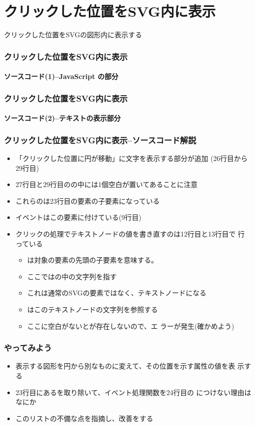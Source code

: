 \section{クリックした位置をSVG内に表示}
\begin{frame}[containsverbatim]
クリックした位置をSVGの図形内に表示する
\end{frame}
\begin{frame}[containsverbatim]
 \frametitle{クリックした位置をSVG内に表示}
 \framesubtitle{ソースコード(1)--JavaScript の部分}
\end{frame}
\begin{frame}[containsverbatim]
 \frametitle{クリックした位置をSVG内に表示}
 \framesubtitle{ソースコード(2)--テキストの表示部分}
\end{frame}
\begin{frame}[containsverbatim]
 \frametitle{クリックした位置をSVG内に表示--ソースコード解説}
 \begin{itemize}
  \item 「クリックした位置に円が移動」に文字を表示する部分が追加
        (26行目から29行目)
  \item 27行目と29行目のの中には1個空白が置いてあることに注意
  \item これらのは23行目の要素の子要素になっている
  \item {}イベントはこの要素に付けている(9行目)
  \item クリックの処理でテキストノードの値を書き直すのは12行目と13行目で
        行っている
        \begin{itemize}
         \item {}は対象の要素の先頭の子要素を意味する。
         \item ここではの中の文字列を指す
         \item これは通常のSVGの要素ではなく、テキストノードになる
         \item {}はこのテキストノードの文字列を参照する
         \item ここに空白がないとが存在しないので、エ
               ラーが発生(確かめよう)
        \end{itemize}
 \end{itemize}
\end{frame}
\begin{frame}
 \frametitle{やってみよう}
 \begin{itemize}
	\item 表示する図形を円から別なものに変えて、その位置を示す属性の値を表
				示する
	\item 23行目にあるを取り除いて、イベント処理関数を24行目の
				につけない理由はなにか
	\item このリストの不備な点を指摘し、改善をする
 \end{itemize}
\end{frame}

\begin{frame}[containsverbatim]
 \frametitle{}
\end{frame}
